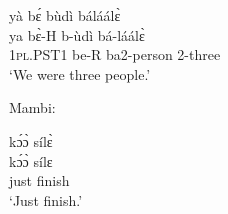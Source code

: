 \begin{exe} 
\exC\label{252} 
  \glll yà bɛ́ bùdì báláálɛ̀ \\
       ya bɛ̀-H b-ùdì bá-láálɛ̀ \\
        1\textsc{pl}.PST1 be-R ba2-person 2-three  \\
    \trans `We were three people.'
\end{exe}

\noindent Mambi:

\begin{exe} 
\exC\label{253} 
  \glll  kɔ́ɔ̀ sílɛ̀ \\
        kɔ́ɔ̀ sílɛ \\
       just finish   \\
    \trans `Just finish.'
\end{exe}





